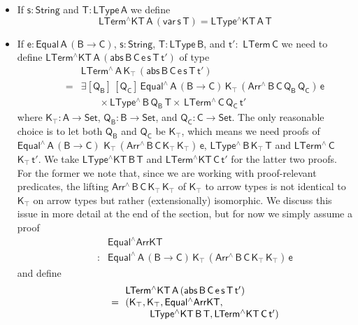 \documentclass[sigplan,10pt,anonymous,review]{acmart}
\begin{document}
\begin{itemize}
\item If $\mathsf{s : String}$ and $\mathsf{T : LType\,A}$ we define
  \[\mathsf{LTerm^\wedge KT\,A\,(var\,s\,T)} = \mathsf{LType^\wedge
  KT\,A\,T}\]
\item If $\mathsf{e : Equal\,A\,(B \to C)}$, $\mathsf{s : String}$,
  $\mathsf{T : LType\,B}$, and $\mathsf{t' :}$ $\mathsf{LTerm\,C}$ we
  need to define $\mathsf{LTerm^\wedge KT\,A\, (abs\, B \,C \, e \,s
    \,T \, t')}$ of type
\[\begin{array}{ll}
 & \!\!\mathsf{LTerm^{\wedge}\,A\,K_\top\, (abs \,B \,C \,e \,s \,T
  \,t')}\\
\quad\quad = & \!\!\mathsf{\exists [Q_B]\, [Q_C]\, Equal^{\wedge} \, A\, (B \to
  C)\, K_\top\, (Arr^{\wedge} \, B\, C\, Q_B \, Q_C)\, e }\\
 & \quad\quad\mathsf{\times \, LType^{\wedge}\, B\, Q_B\, T \times \,
  LTerm^{\wedge}\, C\, Q_C\,t' }
\end{array}\]
where $\mathsf{K_\top : A \to Set}$, $\mathsf{Q_B : B \to Set}$, and
$\mathsf{Q_C : C \to Set}$.  The only reasonable choice is to let both
$\mathsf{Q_B}$ and $\mathsf{Q_C}$ be $\mathsf{K_\top}$, which means we
need proofs of
$\mathsf{Equal^{\wedge} \, A\, (B \to C)}$ $\mathsf{K_\top\,
  (Arr^{\wedge} \, B\, C\, K_\top \, K_\top)\, e}$,
$\mathsf{LType^{\wedge}\, B\, K_\top\, T}$ and
$\mathsf{LTerm^{\wedge}\, C}$ $\mathsf{K_\top\, t'}$.  We take
$\mathsf{LType^\wedge KT\, B\, T}$ and $\mathsf{LTerm^\wedge KT\, C\,
  t'}$ for the latter two proofs. For the former we note that, since
we are working with proof-relevant predicates, the lifting
$\mathsf{Arr^{\wedge} \, B\, C\, K_\top \, K_\top}$ of
$\mathsf{K_\top}$ to arrow types is not identical to $\mathsf{K_\top}$
on arrow types but rather (extensionally) isomorphic.  We discuss this
issue in more detail at the end of the section, but for now we simply
assume a proof \[\begin{array}{ll}
&\!\! \mathsf{Equal^\wedge ArrKT}\\
\quad\quad  : & \!\!\mathsf{Equal^{\wedge} \, A\, (B
  \to C)\, K_\top\, (Arr^{\wedge} \, B\, C\, K_\top \, K_\top)\, e}
\end{array}\]
and define
\[\begin{array}{ll}
 & \!\!\mathsf{LTerm^\wedge KT\,A\, (abs\, B \,C \, e \,s \,T \,
  t')}\\
\quad\quad= & \!\!\mathsf{(K_\top , K_\top , Equal^\wedge ArrKT ,}\\
 & \hspace*{0.3in} \mathsf{LType^\wedge KT\, B\, T , LTerm^\wedge KT\, C\, t') }

\end{array}\]
\end{itemize}
\end{document}

